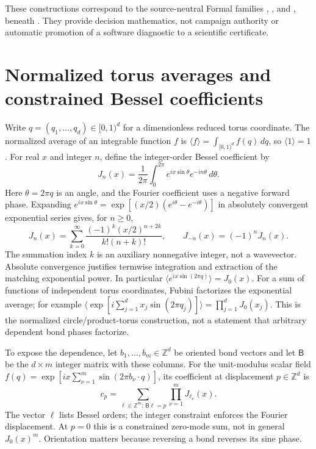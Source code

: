 These constructions correspond to the source-neutral Formal families
,
,
 and
, beneath .
They provide decision mathematics, not campaign authority or automatic
promotion of a software diagnostic to a scientific certificate.

\section{Normalized torus averages and constrained Bessel coefficients}

Write $q=(q_1,\ldots,q_d)\in[0,1)^d$ for a dimensionless reduced torus
coordinate. The normalized average of an integrable function $f$ is
$\langle f\rangle=\int_{[0,1)^d}f(q)\,dq$, so $\langle1\rangle=1$.
For real $x$ and integer $n$, define the integer-order Bessel coefficient by
\begin{equation}
  J_n(x)=\frac1{2\pi}\int_0^{2\pi}
       e^{ix\sin\theta}e^{-in\theta}\,d\theta.
  \label{eq:auxiliary-bessel-coefficient}
\end{equation}
Here $\theta=2\pi q$ is an angle, and the Fourier coefficient uses a negative
forward phase. Expanding
$e^{ix\sin\theta}=\exp[(x/2)(e^{i\theta}-e^{-i\theta})]$
in absolutely convergent exponential series gives, for $n\geq0$,
\begin{equation}
  J_n(x)=\sum_{k=0}^{\infty}
     \frac{(-1)^k(x/2)^{n+2k}}{k!(n+k)!},\qquad
  J_{-n}(x)=(-1)^nJ_n(x).
  \label{eq:auxiliary-bessel-series}
\end{equation}
The summation index $k$ is an auxiliary nonnegative integer, not a wavevector.
Absolute convergence justifies termwise integration and extraction of the
matching exponential power. In particular
$\langle e^{ix\sin(2\pi q)}\rangle=J_0(x)$. For a sum of functions of
independent torus coordinates, Fubini factorizes the exponential average;
for example $\langle\exp[i\sum_{j=1}^d x_j\sin(2\pi q_j)]\rangle
=\prod_{j=1}^d J_0(x_j)$. This is the normalized circle/product-torus
construction, not a statement that arbitrary dependent bond phases factorize.

To expose the dependence, let $b_1,\ldots,b_m\in\mathbb Z^d$ be oriented
bond vectors and let $\mathsf B$ be the $d\times m$ integer matrix with
these columns. For the unit-modulus scalar field
$f(q)=\exp[ix\sum_{\nu=1}^m\sin(2\pi b_\nu\cdot q)]$, its coefficient
at displacement $p\in\mathbb Z^d$ is
\begin{equation}
  c_p=\sum_{\ell\in\mathbb Z^m:\,\mathsf B\ell=p}
           \prod_{\nu=1}^m J_{\ell_\nu}(x).
  \label{eq:auxiliary-constrained-bessel-coefficient}
\end{equation}
The vector $\ell$ lists Bessel orders; the integer constraint enforces the
Fourier displacement. At $p=0$ this is a constrained zero-mode sum, not in
general $J_0(x)^m$. Orientation matters because reversing a bond reverses
its sine phase.

